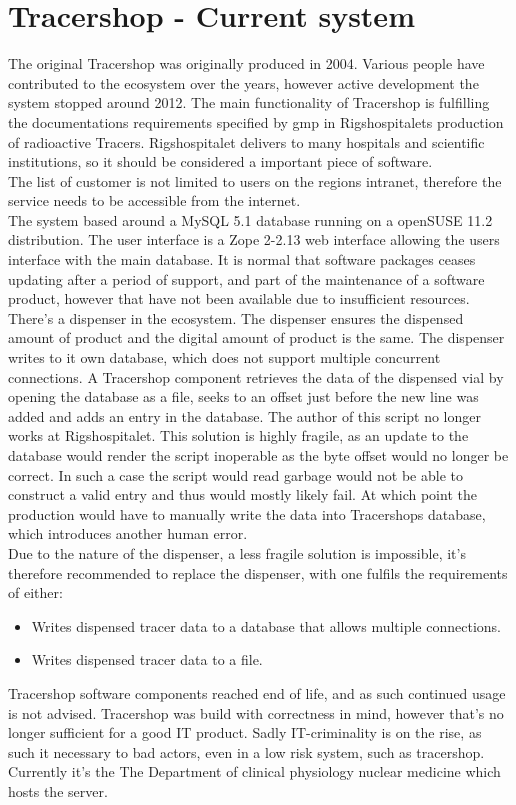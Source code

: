 \documentclass{article}
\begin{document}
\section*{Tracershop - Current system}
The original Tracershop was originally produced in 2004. Various people have contributed to the ecosystem over the years,
however active development the system stopped around 2012.
The main functionality of Tracershop is fulfilling the documentations requirements specified by \gls{gmp} in Rigshospitalets production of radioactive Tracers.
Rigshospitalet delivers to many hospitals and scientific institutions,
so it should be considered a important piece of software.\\
The list of customer is not limited to users on the regions intranet, therefore the service needs to be accessible from the internet.\\
The system based around a MySQL 5.1 database running on a openSUSE 11.2 distribution.
The user interface is a  Zope 2-2.13 web interface allowing the users interface with the main database.
It is normal that software packages ceases updating after a period of support, and part of the maintenance of a software product,
however that have not been available due to insufficient resources.\\
There's a dispenser in the ecosystem. The dispenser ensures the dispensed amount of product and the digital amount of product is the same.
The dispenser writes to it own database, which does not support multiple concurrent connections.
A Tracershop component retrieves the data of the dispensed vial by opening the database as a file, seeks to an offset just before the new line was added and
adds an entry in the database. The author of this script no longer works at Rigshospitalet. This solution is highly fragile, as an update to the database would
render the script inoperable as the byte offset would no longer be correct.
In such a case the script would read garbage would not be able to construct a valid entry and thus would mostly likely fail.
At which point the production would have to manually write the data into Tracershops database, which introduces another human error.\\
Due to the nature of the dispenser, a less fragile solution is impossible, it's therefore recommended to replace the dispenser, with one fulfils the requirements of either:
\begin{itemize}
  \item Writes dispensed tracer data to a database that allows multiple connections.
  \item Writes dispensed tracer data to a file.
\end{itemize}
Tracershop software components reached end of life, and as such continued usage is not advised. Tracershop was build with correctness in mind,
however that's no longer sufficient for a good IT product. Sadly IT-criminality is on the rise, as such it necessary to bad actors, even in a low risk system,
such as tracershop.\\
Currently it's the The Department of clinical physiology nuclear medicine which hosts the server.
\end{document}
